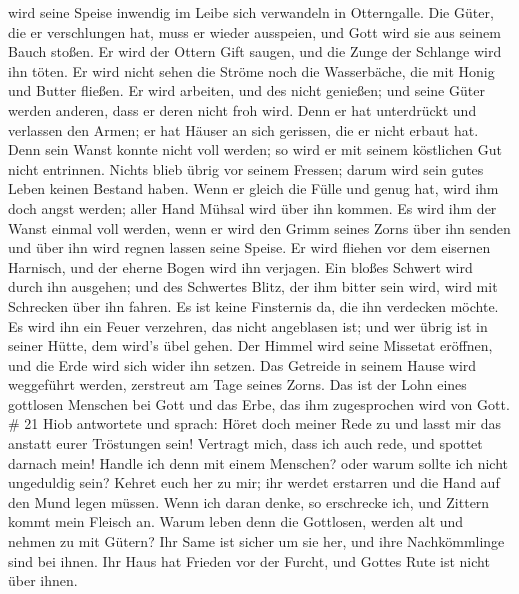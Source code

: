 wird seine Speise inwendig im Leibe sich verwandeln in Otterngalle.
 Die Güter, die er verschlungen hat, muss er wieder
ausspeien, und Gott wird sie aus seinem Bauch stoßen.  Er
wird der Ottern Gift saugen, und die Zunge der Schlange wird ihn töten.
 Er wird nicht sehen die Ströme noch die Wasserbäche, die
mit Honig und Butter fließen.  Er wird arbeiten, und des
nicht genießen; und seine Güter werden anderen, dass er deren nicht froh
wird.  Denn er hat unterdrückt und verlassen den Armen; er
hat Häuser an sich gerissen, die er nicht erbaut hat.  Denn
sein Wanst konnte nicht voll werden; so wird er mit seinem köstlichen
Gut nicht entrinnen.  Nichts blieb übrig vor seinem
Fressen; darum wird sein gutes Leben keinen Bestand haben. 
Wenn er gleich die Fülle und genug hat, wird ihm doch angst werden;
aller Hand Mühsal wird über ihn kommen.  Es wird ihm der
Wanst einmal voll werden, wenn er wird den Grimm seines Zorns über ihn
senden und über ihn wird regnen lassen seine Speise.  Er
wird fliehen vor dem eisernen Harnisch, und der eherne Bogen wird ihn
verjagen.  Ein bloßes Schwert wird durch ihn ausgehen; und
des Schwertes Blitz, der ihm bitter sein wird, wird mit Schrecken über
ihn fahren.  Es ist keine Finsternis da, die ihn verdecken
möchte. Es wird ihn ein Feuer verzehren, das nicht angeblasen ist; und
wer übrig ist in seiner Hütte, dem wird's übel gehen.  Der
Himmel wird seine Missetat eröffnen, und die Erde wird sich wider ihn
setzen.  Das Getreide in seinem Hause wird weggeführt
werden, zerstreut am Tage seines Zorns.  Das ist der Lohn
eines gottlosen Menschen bei Gott und das Erbe, das ihm zugesprochen
wird von Gott. \# 21  Hiob antwortete und sprach:
 Höret doch meiner Rede zu und lasst mir das anstatt eurer
Tröstungen sein!  Vertragt mich, dass ich auch rede, und
spottet darnach mein!  Handle ich denn mit einem Menschen?
oder warum sollte ich nicht ungeduldig sein?  Kehret euch
her zu mir; ihr werdet erstarren und die Hand auf den Mund legen müssen.
 Wenn ich daran denke, so erschrecke ich, und Zittern kommt
mein Fleisch an.  Warum leben denn die Gottlosen, werden alt
und nehmen zu mit Gütern?  Ihr Same ist sicher um sie her,
und ihre Nachkömmlinge sind bei ihnen.  Ihr Haus hat Frieden
vor der Furcht, und Gottes Rute ist nicht über ihnen. 
